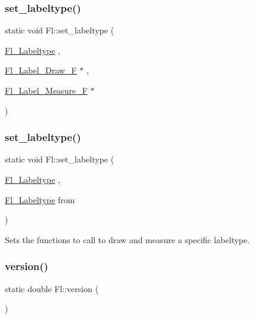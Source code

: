 \subsubsection{\texorpdfstring{set\+\_\+labeltype()}{set\_labeltype()}\hspace{0.1cm}{\footnotesize\ttfamily [1/2]}}
{\footnotesize\ttfamily static void Fl\+::set\+\_\+labeltype (\begin{DoxyParamCaption}\item[{\hyperlink{_enumerations_8_h_ad5774781d33328b82990ff9e25dfd61b}{Fl\+\_\+\+Labeltype}}]{,  }\item[{\hyperlink{group__callback__functions_ga569530b250a4e2f56022249512687a0c}{Fl\+\_\+\+Label\+\_\+\+Draw\+\_\+F} $\ast$}]{,  }\item[{\hyperlink{group__callback__functions_ga946140c0dcd42dbef9f134af6f2da17b}{Fl\+\_\+\+Label\+\_\+\+Measure\+\_\+F} $\ast$}]{ }\end{DoxyParamCaption})\hspace{0.3cm}{\ttfamily [static]}}

\mbox{\label{class_fl_ad1633da3e36598ebe875f0c16fc9f198}} 
\subsubsection{\texorpdfstring{set\+\_\+labeltype()}{set\_labeltype()}\hspace{0.1cm}{\footnotesize\ttfamily [2/2]}}
{\footnotesize\ttfamily static void Fl\+::set\+\_\+labeltype (\begin{DoxyParamCaption}\item[{\hyperlink{_enumerations_8_h_ad5774781d33328b82990ff9e25dfd61b}{Fl\+\_\+\+Labeltype}}]{,  }\item[{\hyperlink{_enumerations_8_h_ad5774781d33328b82990ff9e25dfd61b}{Fl\+\_\+\+Labeltype}}]{from }\end{DoxyParamCaption})\hspace{0.3cm}{\ttfamily [static]}}

Sets the functions to call to draw and measure a specific labeltype. \mbox{\label{class_fl_a691ce8682015fdbd38e49e9257316409}} 
\subsubsection{\texorpdfstring{version()}{version()}}
{\footnotesize\ttfamily static double Fl\+::version (\begin{DoxyParamCaption}{ }\end{DoxyParamCaption})\hspace{0.3cm}{\ttfamily [static]}}

